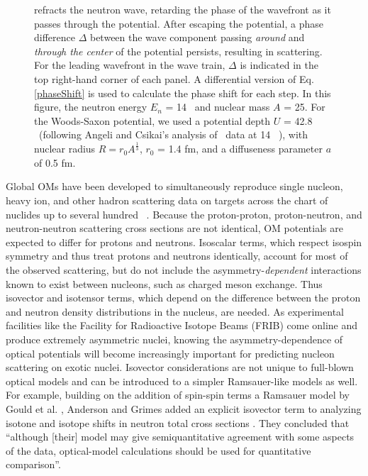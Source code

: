 \begin{figure}[tb]
{        refracts the neutron wave,
        retarding the phase of the wavefront as it passes through the
        potential. After escaping the potential, a phase difference $\Delta$ between
        the wave component passing \textit{around} and \textit{through the center}
        of the potential persists, resulting in scattering.
        For the leading wavefront in the wave train, $\Delta$ is indicated in
        the top right-hand corner of each panel. A differential version of
        Eq. \ref{phaseShift} is used to
        calculate the phase shift for each step. In this figure, the neutron
        energy $E_{n}$ = 14 \mega\electronvolt\ and nuclear mass $A$ = 25. For the Woods-Saxon potential,
        we used a potential depth $U$ = 42.8 \mega\electronvolt\ (following Angeli and Csikai's analysis
        of \tot\ data at 14 \mega\electronvolt\ \cite{Angeli1970}), with nuclear radius $R = 
        r_{0}A^{\frac{1}{3}}$, $r_{0}$ = 1.4 fm, and a diffuseness parameter
        $a$ of 0.5 fm.
    }
    \label{RamsauerPhaseShiftFigure}
\end{figure}

Global OMs have been developed to simultaneously reproduce single nucleon, heavy ion,
and other hadron scattering data on targets across the chart of nuclides up to several
hundred \mega\electronvolt\ \cite{CH89, KoningDelaroche}. Because the proton-proton,
proton-neutron, and neutron-neutron scattering cross sections
are not identical, OM potentials are expected to differ for protons and
neutrons. Isoscalar terms, which respect isospin symmetry and thus treat protons and neutrons 
identically, account for most of the observed scattering, but do not include
the asymmetry-\textit{dependent} interactions known to exist between
nucleons, such as charged meson exchange.
Thus isovector and isotensor terms,
which depend on the difference between the proton and neutron density
distributions in the nucleus, are needed. As experimental facilities like
the Facility for Radioactive Isotope Beams (FRIB) come online and produce
extremely asymmetric nuclei, knowing the asymmetry-dependence of optical
potentials will become increasingly important for predicting nucleon scattering on
exotic nuclei. Isovector considerations are not unique to full-blown optical
models and can be introduced to a simpler Ramsauer-like models as well. For example, building
on the addition of spin-spin terms a Ramsauer model by Gould et al. \cite{Gould1986},
Anderson and Grimes added an explicit isovector term to analyzing isotone and isotope shifts in 
neutron total cross sections \cite{Anderson1990}.
They concluded that ``although [their] model may give
semiquantitative agreement with some aspects of the data, optical-model
calculations should be used for quantitative comparison''.

